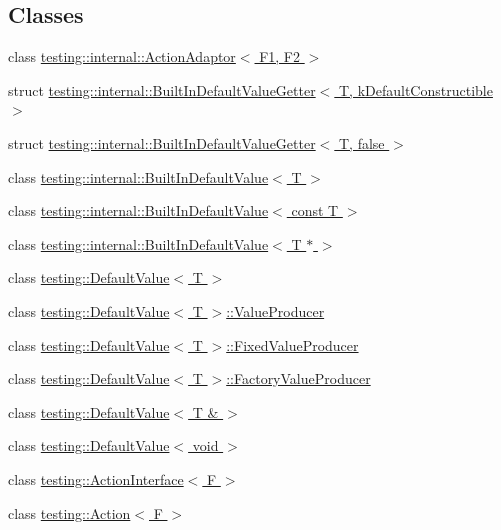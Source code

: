 \subsection*{Classes}
\begin{DoxyCompactItemize}
\item 
class \hyperlink{classtesting_1_1internal_1_1ActionAdaptor}{testing\+::internal\+::\+Action\+Adaptor$<$ F1, F2 $>$}
\item 
struct \hyperlink{structtesting_1_1internal_1_1BuiltInDefaultValueGetter}{testing\+::internal\+::\+Built\+In\+Default\+Value\+Getter$<$ T, k\+Default\+Constructible $>$}
\item 
struct \hyperlink{structtesting_1_1internal_1_1BuiltInDefaultValueGetter_3_01T_00_01false_01_4}{testing\+::internal\+::\+Built\+In\+Default\+Value\+Getter$<$ T, false $>$}
\item 
class \hyperlink{classtesting_1_1internal_1_1BuiltInDefaultValue}{testing\+::internal\+::\+Built\+In\+Default\+Value$<$ T $>$}
\item 
class \hyperlink{classtesting_1_1internal_1_1BuiltInDefaultValue_3_01const_01T_01_4}{testing\+::internal\+::\+Built\+In\+Default\+Value$<$ const T $>$}
\item 
class \hyperlink{classtesting_1_1internal_1_1BuiltInDefaultValue_3_01T_01_5_01_4}{testing\+::internal\+::\+Built\+In\+Default\+Value$<$ T $\ast$ $>$}
\item 
class \hyperlink{classtesting_1_1DefaultValue}{testing\+::\+Default\+Value$<$ T $>$}
\item 
class \hyperlink{classtesting_1_1DefaultValue_1_1ValueProducer}{testing\+::\+Default\+Value$<$ T $>$\+::\+Value\+Producer}
\item 
class \hyperlink{classtesting_1_1DefaultValue_1_1FixedValueProducer}{testing\+::\+Default\+Value$<$ T $>$\+::\+Fixed\+Value\+Producer}
\item 
class \hyperlink{classtesting_1_1DefaultValue_1_1FactoryValueProducer}{testing\+::\+Default\+Value$<$ T $>$\+::\+Factory\+Value\+Producer}
\item 
class \hyperlink{classtesting_1_1DefaultValue_3_01T_01_6_01_4}{testing\+::\+Default\+Value$<$ T \& $>$}
\item 
class \hyperlink{classtesting_1_1DefaultValue_3_01void_01_4}{testing\+::\+Default\+Value$<$ void $>$}
\item 
class \hyperlink{classtesting_1_1ActionInterface}{testing\+::\+Action\+Interface$<$ F $>$}
\item 
class \hyperlink{classtesting_1_1Action}{testing\+::\+Action$<$ F $>$}

\end{DoxyCompactItemize}
